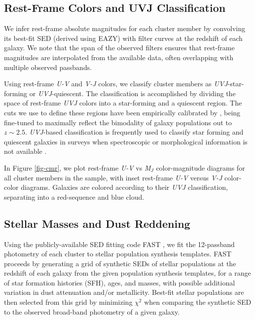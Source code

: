 
\subsection{Rest-Frame Colors and UVJ Classification}\label{sec-UVJ}


We infer rest-frame absolute magnitudes for each cluster member by convolving its best-fit SED (derived using EAZY) with filter curves at the redshift of each galaxy.
We note that the span of the observed filters ensures that rest-frame magnitudes are interpolated from the available data, often overlapping with multiple observed passbands.

Using rest-frame \textit{U-V} and \textit{V-J} colors, we classify cluster members as \textit{UVJ}-star-forming or \textit{UVJ}-quiescent.
The classification is accomplished by dividing the space of rest-frame \textit{UVJ} colors into a star-forming and a quiescent region.
The cuts we use to define these regions have been empirically calibrated by \citet{Williams:2009tt}, being fine-tuned to maximally reflect the bimodality of galaxy populations out to $z\sim2.5$.
\textit{UVJ}-based classification is frequently used to classify star forming and quiescent galaxies in surveys when spectroscopic or morphological information is not available \citep{Wuyts:2007aa,Williams:2009tt,Whitaker:2011aa,Patel:2012ab,van-der-Burg:2013zn,Whitaker:2013rz,muzzin2013,Strazzullo:2013aa}.

In Figure \ref{fig-cmr}, we plot rest-frame \textit{U-V} vs \textit{M$_J$} color-magnitude diagrams for all cluster members in the sample, with inset rest-frame \textit{U-V} versus \textit{V-J} color-color diagrams.
Galaxies are colored according to their \textit{UVJ} classification, separating into a red-sequence and blue cloud.

\subsection{Stellar Masses and Dust Reddening}\label{sec-fast}

Using the publicly-available SED fitting code FAST \citep{Kriek:2009eq}, we fit the 12-passband photometry of each cluster to \citet[hereafter BC03]{Bruzual:2003by} stellar population synthesis templates.
FAST proceeds by generating a grid of synthetic SEDs of stellar populations at the redshift of each galaxy from the given population synthesis templates, for a range of star formation histories (SFH), ages, and masses, with possible additional variation in dust attenuation and/or metallicity.
Best-fit stellar populations are then selected from this grid by minimizing ${\chi}^2$ when comparing the synthetic SED to the observed broad-band photometry of a given galaxy.

